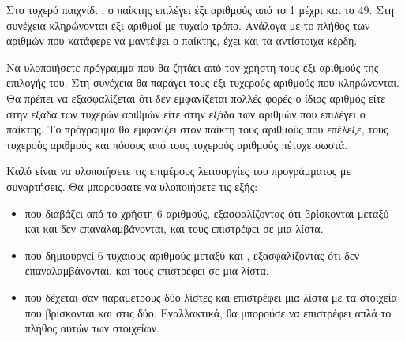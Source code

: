 \documentclass[a4paper,11pt,oneside]{book}
\begin{document}
\begin{exercise}
Στο τυχερό παιχνίδι , ο παίκτης επιλέγει έξι αριθμούς από το 1 μέχρι και το 49. Στη συνέχεια κληρώνονται έξι αριθμοί με τυχαίο τρόπο. Ανάλογα με το πλήθος των αριθμών που κατάφερε να μαντέψει ο παίκτης, έχει και τα αντίστοιχα κέρδη. 

Να υλοποιήσετε πρόγραμμα που θα ζητάει από τον χρήστη τους έξι αριθμούς της επιλογής του. Στη συνέχεια θα παράγει τους έξι τυχερούς αριθμούς που κληρώνονται. Θα πρέπει να εξασφαλίζεται ότι δεν εμφανίζεται πολλές φορές ο ίδιος αριθμός είτε στην εξάδα των τυχερών αριθμών είτε στην εξάδα των αριθμών που επιλέγει ο παίκτης.
Το πρόγραμμα θα εμφανίζει στον παίκτη τους αριθμούς που επέλεξε, τους τυχερούς αριθμούς και πόσους από τους τυχερούς αριθμούς πέτυχε σωστά. 

\begin{note}
Καλό είναι να υλοποιήσετε τις επιμέρους λειτουργίες του προγράμματος με συναρτήσεις. Θα μπορούσατε να υλοποιήσετε τις εξής:
\begin{itemize}
\item {} που διαβάζει από το χρήστη 6 αριθμούς, εξασφαλίζοντας ότι βρίσκονται μεταξύ  και  και δεν επαναλαμβάνονται, και τους επιστρέφει σε μια λίστα.
\item {} που δημιουργεί 6 τυχαίους αριθμούς μεταξύ  και , εξασφαλίζοντας ότι δεν επαναλαμβάνονται, και τους επιστρέφει σε μια λίστα.
\item {} που δέχεται σαν παραμέτρους δύο λίστες και επιστρέφει μια λίστα με τα στοιχεία που βρίσκονται και στις δύο. Εναλλακτικά, θα μπορούσε να επιστρέφει απλά το πλήθος αυτών των στοιχείων.
\end{itemize}
\end{note}
\end{exercise}

\end{document}
